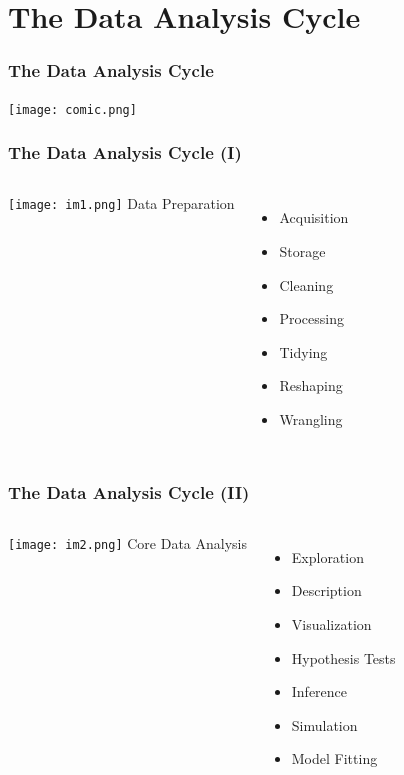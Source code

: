 \documentclass{beamer}
\begin{document}
\section{The Data Analysis Cycle}
\begin{frame}
\frametitle{The Data Analysis Cycle}
\begin{center}
\texttt{[image: comic.png]}
\end{center}
\end{frame}
\begin{frame}
\frametitle{The Data Analysis Cycle (I)}
\begin{columns}
    \hspace*{1cm}
    \texttt{[image: im1.png]}
    Data Preparation  
    \begin{itemize}
    \item[] Acquisition
    \item[] Storage
    \item[] Cleaning
    \item[] Processing
    \item[] Tidying
    \item[] Reshaping
    \item[] Wrangling
    \end{itemize}
\end{columns}
\end{frame}
\begin{frame}
\frametitle{The Data Analysis Cycle (II)}
\begin{columns}
    \hspace*{1cm}
    \texttt{[image: im2.png]}
    Core Data Analysis  
    \begin{itemize}
    \item[] Exploration
    \item[] Description
    \item[] Visualization
    \item[] Hypothesis Tests
    \item[] Inference
    \item[] Simulation
    \item[] Model Fitting
    \end{itemize}
\end{columns}
\end{frame}
\end{document}
